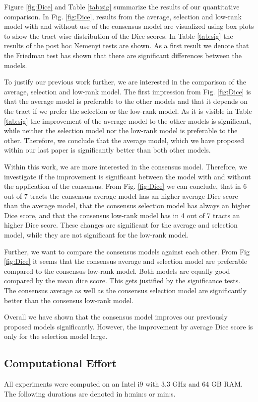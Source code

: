 Figure \ref{fig:Dice} and Table \ref{tab:sig} summarize the results of our
quantitative comparison. In Fig. \ref{fig:Dice}, results from the average,
selection and low-rank model with and without use of the consensus model are
visualized using box plots to show the tract wise distribution of the Dice
scores. In Table \ref{tab:sig} the results of the post hoc Nemenyi tests are
shown. As a first result we denote that the Friedman test has shown that there
are significant differences between the models. 

To justify our previous work further, we are interested in the comparison of the
average, selection and low-rank model. The first impression from Fig.
\ref{fig:Dice} is that the average model is preferable to the other models and
that it depends on the tract if we prefer the selection or the low-rank model.
As it is visible in Table \ref{tab:sig} the improvement of the average model to
the other models is significant, while neither the selection model nor the
low-rank model is preferable to
the other. Therefore, we conclude that the average model, which we have proposed
within our last paper is significantly better than both other models. 

Within this work, we are more interested in the consensus model. Therefore, we
investigate if the improvement is significant between the model with and without
the application of the consensus. From Fig. \ref{fig:Dice} we can conclude, that
in 6 out of 7 tracts the consensus average model has an higher average Dice
score than the average model, that the consensus selection model has always an
higher Dice score, and that the consensus low-rank model has in 4 out of 7
tracts an higher Dice score. These changes are significant for the average and
selection model, while they are not significant for the low-rank model. 

Further, we want to compare the consensus models against each other. From Fig
\ref{fig:Dice} it seems that the consensus average and selection model are
preferable compared to the consensus low-rank model. Both models are equally
good compared by the mean dice score. This gets justified by the significance
tests. The consensus average as well as the consensus selection model are
significantly better than the consensus low-rank model. 

Overall we have shown that the consensus model improves our previously proposed
models significantly. However, the improvement by average Dice score is only for
the selection model large. 
\subsection{Computational Effort}
All experiments were computed on an Intel i9 with 3.3 GHz and 64 GB RAM. The
following durations are denoted in h:min:s or min:s.

